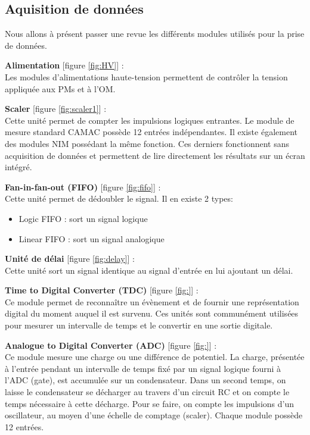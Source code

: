 \FloatBarrier

\subsection{Aquisition de donn{\'e}es}
Nous allons à présent passer une revue les différents modules utilisés pour la prise de données.

\textbf{Alimentation} [figure \ref{fig:HV}] :\\
Les modules d'alimentations haute-tension permettent de contrôler la tension appliquée aux PMs et à l'OM.

\textbf{Scaler} [figure \ref{fig:scaler1}] :\\
Cette unité permet de compter les impulsions logiques entrantes. Le module de mesure standard CAMAC possède 12 entrées indépendantes. Il existe également des modules NIM possédant la même fonction. Ces derniers fonctionnent sans acquisition de données et permettent de lire directement les résultats sur un écran intégré.

\textbf{Fan-in-fan-out (FIFO)} [figure  \ref{fig:fifo}] :\\
Cette unité permet de dédoubler le signal. Il en existe 2 types:
\begin{itemize}
\item Logic FIFO : sort un signal logique
\item Linear FIFO : sort un signal analogique
\end{itemize}

\textbf{Unité de délai} [figure \ref{fig:delay}] :\\
Cette unité sort un signal identique au signal d'entrée en lui ajoutant un délai.

\textbf{Time to Digital Converter (TDC)} [figure \ref{fig:}] :\\
Ce module permet de reconnaître un évènement et de fournir une représentation digital du moment auquel il est survenu. Ces unités sont communément utilisées pour mesurer un intervalle de temps et le convertir en une sortie digitale.

\textbf{Analogue to Digital Converter (ADC)} [figure \ref{fig:}] :\\
Ce module mesure une charge ou une différence de potentiel. 
La charge, présentée à l’entrée pendant un intervalle de temps fixé par un signal logique fourni à l’ADC (gate), est accumulée sur un condensateur. Dans un second temps, on laisse le condensateur se décharger au travers d’un circuit RC et on compte le temps nécessaire à cette décharge. Pour se faire, on compte les impulsions d’un oscillateur, au moyen d’une échelle de comptage (scaler). Chaque module possède 12 entrées.

